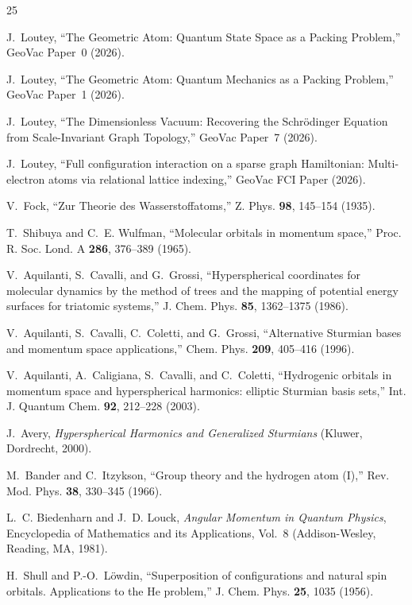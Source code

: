\documentclass[aps,pra,twocolumn,superscriptaddress,longbibliography]{revtex4-2}
\begin{document}
\begin{thebibliography}{25}

J.~Loutey,
``The Geometric Atom: Quantum State Space as a Packing Problem,''
GeoVac Paper~0 (2026).

J.~Loutey,
``The Geometric Atom: Quantum Mechanics as a Packing Problem,''
GeoVac Paper~1 (2026).

J.~Loutey,
``The Dimensionless Vacuum: Recovering the Schr\"odinger Equation
from Scale-Invariant Graph Topology,''
GeoVac Paper~7 (2026).

J.~Loutey,
``Full configuration interaction on a sparse graph Hamiltonian:
Multi-electron atoms via relational lattice indexing,''
GeoVac FCI Paper (2026).

V.~Fock,
``Zur Theorie des Wasserstoffatoms,''
Z. Phys. \textbf{98}, 145--154 (1935).

T.~Shibuya and C.~E. Wulfman,
``Molecular orbitals in momentum space,''
Proc. R. Soc. Lond. A \textbf{286}, 376--389 (1965).

V.~Aquilanti, S.~Cavalli, and G.~Grossi,
``Hyperspherical coordinates for molecular dynamics by the method
of trees and the mapping of potential energy surfaces for triatomic
systems,''
J. Chem. Phys. \textbf{85}, 1362--1375 (1986).

V.~Aquilanti, S.~Cavalli, C.~Coletti, and G.~Grossi,
``Alternative Sturmian bases and momentum space applications,''
Chem. Phys. \textbf{209}, 405--416 (1996).

V.~Aquilanti, A.~Caligiana, S.~Cavalli, and C.~Coletti,
``Hydrogenic orbitals in momentum space and hyperspherical harmonics:
elliptic Sturmian basis sets,''
Int. J. Quantum Chem. \textbf{92}, 212--228 (2003).

J.~Avery,
\textit{Hyperspherical Harmonics and Generalized Sturmians}
(Kluwer, Dordrecht, 2000).

M.~Bander and C.~Itzykson,
``Group theory and the hydrogen atom (I),''
Rev. Mod. Phys. \textbf{38}, 330--345 (1966).

L.~C. Biedenharn and J.~D. Louck,
\textit{Angular Momentum in Quantum Physics},
Encyclopedia of Mathematics and its Applications, Vol.~8
(Addison-Wesley, Reading, MA, 1981).

H.~Shull and P.-O.~L\"owdin,
``Superposition of configurations and natural spin orbitals.
Applications to the He problem,''
J. Chem. Phys. \textbf{25}, 1035 (1956).


\end{thebibliography}
\end{document}

